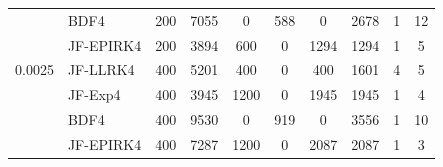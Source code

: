 \begin{table}[htb]
\begin{adjustbox}{width=0.9\columnwidth,center}
\begin{tabular}{cccccccccc}
			\multicolumn{1}{l}{} & \multicolumn{1}{l}{BDF4} & 200 & 7055 & 0 & 588 & 0 &
			2678 & 1 & 12 \\
			\multicolumn{1}{l}{} & \multicolumn{1}{l}{JF-EPIRK4} & 200 & 3894 & 600 & 0 &
			1294 & 1294 & 1 & 5 \\
			\multicolumn{1}{l}{0.0025} & \multicolumn{1}{l}{JF-LLRK4} & 400 & 5201 & 400
			& 0 & 400 & 1601 & 4 & 5 \\
			\multicolumn{1}{l}{} & \multicolumn{1}{l}{JF-Exp4} & 400 & 3945 & 1200 & 0 &
			1945 & 1945 & 1 & 4 \\
			\multicolumn{1}{l}{} & \multicolumn{1}{l}{BDF4} & 400 & 9530 & 0 & 919 & 0 &
			3556 & 1 & 10 \\
			\multicolumn{1}{l}{} & \multicolumn{1}{l}{JF-EPIRK4} & 400 & 7287 & 1200 & 0 &
			2087 & 2087 & 1 & 3 \\
			\hline
		\end{tabular}
	\end{adjustbox}
	\label{tab:br}
\end{table}



